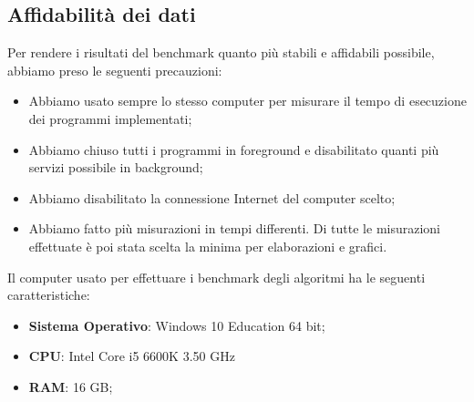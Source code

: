 \subsection{Affidabilità dei dati}

\noindent Per rendere i risultati del benchmark quanto più stabili e
affidabili possibile, abbiamo preso le seguenti precauzioni:

\begin{itemize}
    \item Abbiamo usato sempre lo stesso computer per misurare il
      tempo di esecuzione dei programmi implementati;
    \item Abbiamo chiuso tutti i programmi in foreground e
      disabilitato quanti più servizi possibile in background;
    \item Abbiamo disabilitato la connessione Internet del computer
      scelto;
    \item Abbiamo fatto più misurazioni in tempi differenti. Di tutte
      le misurazioni effettuate è poi stata scelta la minima per
      elaborazioni e grafici.
\end{itemize}

\noindent Il computer usato per effettuare i benchmark degli algoritmi
ha le seguenti caratteristiche:

\begin{itemize}
    \item \textbf{Sistema Operativo}: Windows 10 Education 64 bit;
    \item \textbf{CPU}: Intel Core i5 6600K 3.50 GHz
    \item \textbf{RAM}: 16 GB;
\end{itemize}
